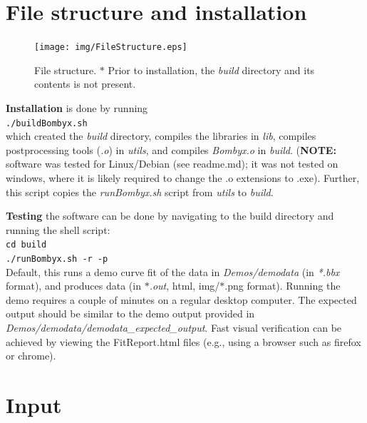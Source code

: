 \documentclass[  superscriptaddress]{revtex4}
\begin{document}
\section{File structure and installation }



\begin{figure}[h]
  \centering
  \texttt{[image: img/FileStructure.eps]}
  \caption{File structure. $\ast$ Prior to installation, the \emph{build} directory and its contents is not present.  }
  \label{fig:FileStructure}
\end{figure}

\textbf{Installation} is done by running\\
\texttt{./buildBombyx.sh}\\
which created the \emph{build} directory, compiles the libraries in \emph{lib}, compiles postprocessing tools (\emph{.o}) in \emph{utils}, and compiles \emph{Bombyx.o} in \emph{build}.
(\textbf{NOTE:} software was tested for Linux/Debian (see readme.md); it was not tested on windows, where it is likely required to change the .o extensions  to .exe).
Further, this script copies the \emph{runBombyx.sh} script from \emph{utils} to \emph{build}.

\textbf{Testing} the software can be done by navigating to the build directory and running the shell script:\\
\texttt{cd build}\\
\texttt{./runBombyx.sh -r -p}\\
Default, this runs a demo curve fit of the data in \emph{Demos/demodata} (in \emph{*.bbx} format), and produces data (in \emph{$\ast$.out}, html, img/$\ast$.png format).
Running the demo requires a couple of minutes on a regular desktop computer.
The expected output should be similar to the demo output provided in \emph{Demos/demodata/demodata\_expected\_output}. Fast visual verification can be achieved by viewing the FitReport.html files (e.g., using a browser such as firefox or chrome).  



\section{Input}
\end{document}
